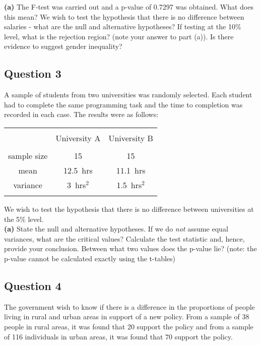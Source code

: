 \documentclass[12pt]{article}
\begin{document}
{\bf(a)} The F-test was carried out and a p-value of 0.7297 was obtained. What does this mean?  We wish to test the hypothesis that there is no difference between salaries - what are the null and alternative hypotheses?  If testing at the 10\% level, what is the rejection region? (note your answer to part (a)).  Is there evidence to suggest gender inequality?



\subsection*{Question 3}
A sample of students from two universities was randomly selected. Each student had to complete the same programming task and the time to completion was recorded in each case. The results were as follows: \\[-0.2cm]

\begin{center}
\begin{tabular}{|c|c|c|}
\hline
&&\\[-0.4cm]
& University A & University B \\
\hline
&&\\[-0.4cm]
sample size & 15 & 15 \\
mean & 12.5\,\,\,hrs & 11.1\,\,\,hrs \\
variance & 3\,\,\,hrs$^2$ & 1.5\,\,\,hrs$^2$ \\
\hline
\multicolumn{3}{c}{}\\[-0.3cm]
\end{tabular}
\end{center}

We wish to test the hypothesis that there is no difference between universities at the 5\% level.\\[0.2cm]
{\bf(a)} State the null and alternative hypotheses.  If we do \emph{not} assume equal variances, what are the critical values?  Calculate the test statistic and, hence, provide your conclusion.  Between what two values does the p-value lie? (note: the p-value cannot be calculated exactly using the t-tables)



\subsection*{Question 4}
The government wish to know if there is a difference in the proportions of people living in rural and urban areas in support of a new policy. From a sample of 38 people in rural areas, it was found that 20 support the policy and from a sample of 116 individuals in urban areas, it was found that 70 support the policy. \\[-0.2cm]
\end{document}
